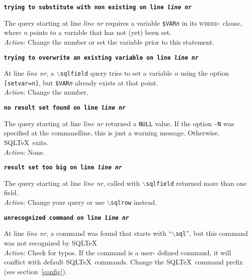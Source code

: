 \documentclass{article}
\newcommand{\bs}{\ensuremath{\backslash}}
\newcommand{\vs}{\vspace{3mm}}
\begin{document}
\vs

\noindent\textbf{\texttt{trying to substitute with non existing on line \textit{line nr}}}

\vspace{1mm}

\noindent The query starting at line \textit{line nr} requires a variable \texttt{\$VAR\textit{n}} in its
\textsc{where}- clause, where \textit{n} points to a variable that has not (yet) been set. \\
\textit{Action:} Change the number or set the variable prior to this statement.

\vs

\noindent\textbf{\texttt{trying to overwrite an existing variable on line \textit{line nr}}}

\vspace{1mm}

\noindent At line \textit{line nr}, a \texttt{\bs sqlfield} query tries to set a variable \textit{n}
using the option \texttt{[setvar=\textit{n}]}, but \texttt{\$VAR\textit{n}} already
exists at that point. \\
\textit{Action:} Change the number.

\vs

\noindent\textbf{\texttt{no result set found on line \textit{line nr}}}

\vspace{1mm}

\noindent The query starting at line \textit{line nr} returned a \texttt{NULL} value. If the
option \texttt{-N} was specified at the commandline, this is just a warning message.
Otherwise, SQL\TeX\ exits. \\
\textit{Action:} None.

\vs

\noindent\textbf{\texttt{result set too big on line \textit{line nr}}}

\vspace{1mm}

\noindent The query starting at line \textit{line nr}, called with \texttt{\bs sqlfield} returned more than one field. \\
\textit{Action:} Change your query or use \texttt{\bs sqlrow} instead.

\vs

\noindent\textbf{\texttt{unrecognized command on line \textit{line nr}}}

\vspace{1mm}

\noindent At line \textit{line nr}, a command was found that starts with ``\texttt{\bs sql}'',
but this command was not recognized by SQL\TeX\. \\
\textit{Action:} Check for typos. If the command is a user- defined command, it will
conflict with default SQL\TeX\ commands. Change the SQL\TeX\ command prefix (see section~\ref{config}).
\end{document}

